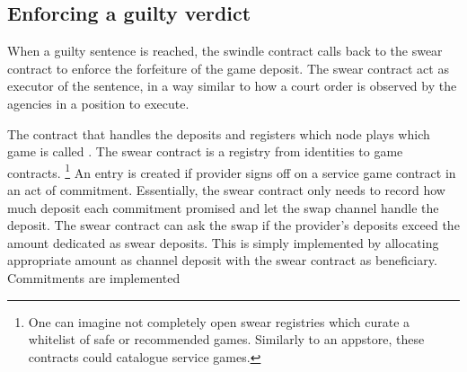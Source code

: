 \subsection{Enforcing a guilty verdict}

When a guilty sentence is reached, the swindle contract calls back to the swear contract to enforce the forfeiture of the game deposit. The swear contract act as executor of the sentence, in a way similar to how a court order is observed by the agencies in a position to execute.  

The contract that handles the deposits and registers which node plays which game is called .
The swear contract is a registry from identities to game contracts.%
%
\footnote{One can imagine not completely open swear registries which curate a whitelist of safe or recommended games. Similarly to an appstore, these contracts could catalogue service games.}
%
An entry is created if provider signs off on a service game contract in an act of commitment. Essentially, the swear contract only needs to record how much deposit each commitment promised and let the swap channel handle the deposit.
The swear contract can  ask the swap if the provider's deposits exceed the amount dedicated as  swear deposits. This is simply implemented by allocating appropriate amount as channel deposit with the swear contract as beneficiary.
Commitments are implemented 
